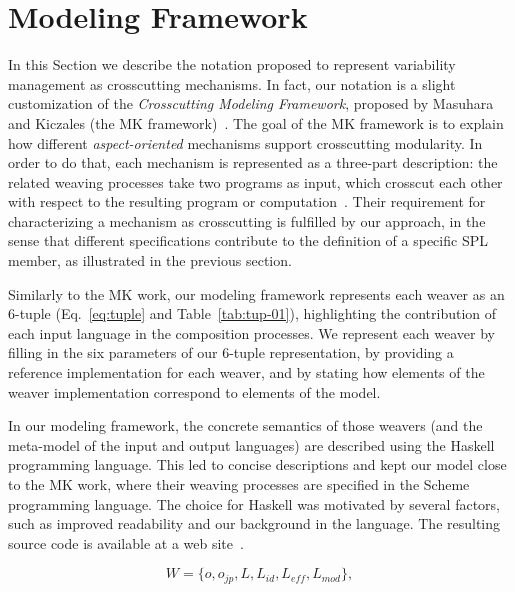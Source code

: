 
\section{Modeling Framework}\label{sec:modeling-framework}

In this Section we describe the notation proposed to represent variability
management as crosscutting mechanisms. In fact, our notation is a slight
customization of the \emph{Crosscutting Modeling Framework}, proposed by Masuhara
and Kiczales (the MK framework)~\cite{Masuhara:2003aa}. The goal of the MK
framework is to explain how different \emph{aspect-oriented} mechanisms support
crosscutting modularity. In order to do that, each mechanism is represented as a
three-part description: the related weaving processes take two programs as input,
which crosscut each other with respect to the resulting program or
computation~\cite{Masuhara:2003aa}.
Their requirement for characterizing a mechanism as crosscutting is fulfilled by
our approach, in the sense that different specifications contribute to the
definition of a specific SPL member, as illustrated in the previous section. 


Similarly to the MK work, our modeling framework represents each
weaver as an 6-tuple (Eq.~\ref{eq:tuple} and Table~\ref{tab:tup-01}),
highlighting the contribution of each input language in the composition
processes. We represent each weaver by filling in the six parameters of our
6-tuple representation, by providing a reference implementation for each weaver,
and by stating how elements of the weaver implementation correspond to elements
of the model.

In our modeling framework, the concrete semantics of those weavers (and the
meta-model of the input and output languages) are described using the Haskell
programming language. This led to concise descriptions and
kept our model close to the MK work, where their weaving processes are specified
in the Scheme programming language. The choice for Haskell was motivated by
several factors, such as improved readability and our background in the language.
The resulting source code is available at a web site~\cite{SPG:site}.

\begin{equation}
W = \{o, o_{jp}, L, L_{id}, L_{eff}, L_{mod}\},
\label{eq:tuple}
\end{equation}

